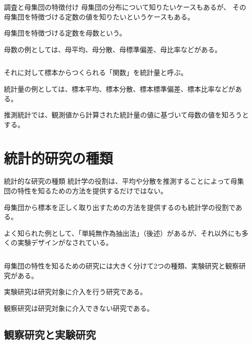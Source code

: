 \documentclass[dvipdfmx, autodetect-engine, aspectratio=169, 10.5pt]{beamer}
\begin{document}
\begin{frame}{調査と母集団の特徴付け}
	母集団の分布について知りたいケースもあるが、
	その母集団を特徴づける定数の値を知りたいというケースもある。

	母集団を特徴づける定数を母数という。

	母数の例としては、母平均、母分散、母標準偏差、母比率などがある。

	${}$

	それに対して標本からつくられる「関数」を統計量と呼ぶ。

	統計量の例としては、標本平均、標本分散、標本標準偏差、標本比率などがある。

	推測統計では、観測値から計算された統計量の値に基づいて母数の値を知ろうとする。
\end{frame}

\section{統計的研究の種類}

\begin{frame}{統計的な研究の種類}
	統計学の役割は、平均や分散を推測することによって母集団の特性を知るための方法を提供するだけではない。

	母集団から標本を正しく取り出すための方法を提供するのも統計学の役割である。

	よく知られた例として、「単純無作為抽出法」（後述）があるが、それ以外にも多くの実験デザインがなされている。

	${}$

	母集団の特性を知るための研究には大きく分けて2つの種類、実験研究と観察研究がある。

	実験研究は研究対象に介入を行う研究である。

	観察研究は研究対象に介入できない研究である。
\end{frame}

\subsection{観察研究と実験研究}
\end{document}
